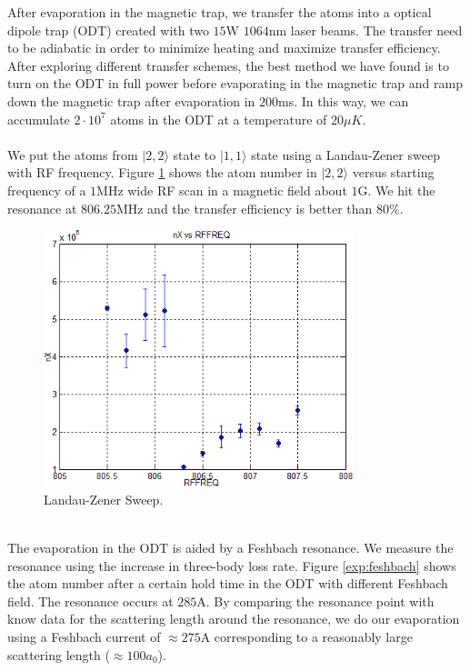After evaporation in the magnetic trap, we transfer the atoms into a optical dipole trap (ODT) created with two $15$W $1064$nm laser beams. The transfer need to be adiabatic in order to minimize heating and maximize transfer efficiency. After exploring different transfer schemes, the best method we have found is to turn on the ODT in full power before evaporating in the magnetic trap and ramp down the magnetic trap after evaporation in $200$ms. In this way, we can accumulate $2\cdot10^7$ atoms in the ODT at a temperature of $20\mu K$.\\
\\
We put the atoms from $|2, 2\rangle$ state to $|1, 1\rangle$ state using a Landau-Zener sweep with RF frequency. Figure \ref{exp:landao-zener} shows the atom number in $|2, 2\rangle$ versus starting frequency of a $1$MHz wide RF scan in a magnetic field about $1$G. We hit the resonance at $806.25$MHz and the transfer efficiency is better than $80\%$.\\
\begin{figure}
  \begin{center}
    \includegraphics[width=9cm]{landao-zener.png}
  \end{center}
  \caption{Landau-Zener Sweep.}
  \label{exp:landao-zener}
\end{figure}\\
The evaporation in the ODT is aided by a Feshbach resonance. We measure the resonance using the increase in three-body loss rate. Figure \ref{exp:feshbach} shows the atom number after a certain hold time in the ODT with different Feshbach field. The resonance occurs at $285$A. By comparing the resonance point with know data for the scattering length around the resonance, we do our evaporation using a Feshbach current of $\approx275$A corresponding to a reasonably large scattering length ($\approx100a_0$).
